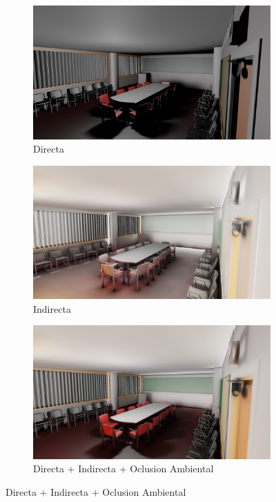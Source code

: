 \begin{figure}[H]
	\centering
	\begin{subfigure}[t]{.49\linewidth}
		\centering
		\captionsetup{justification=centering}
		\caption*{Directa}
		\includegraphics[width=\linewidth]{media/finals/conf_direct.png}
	\end{subfigure}%
	\hspace{0.01\textwidth}
	\begin{subfigure}[t]{.49\linewidth}
		\centering
		\caption*{Indirecta}
		\captionsetup{justification=centering}
		\includegraphics[width=\linewidth]{media/finals/conf_indirect.png}
	\end{subfigure}%
	\par\bigskip
	\begin{subfigure}[t]{.49\linewidth}
		\centering
		\caption*{Directa + Indirecta + Oclusion Ambiental}
		\captionsetup{justification=centering}
		\includegraphics[width=\linewidth]{media/finals/conf_gi.png}

\end{subfigure}
\end{figure}
